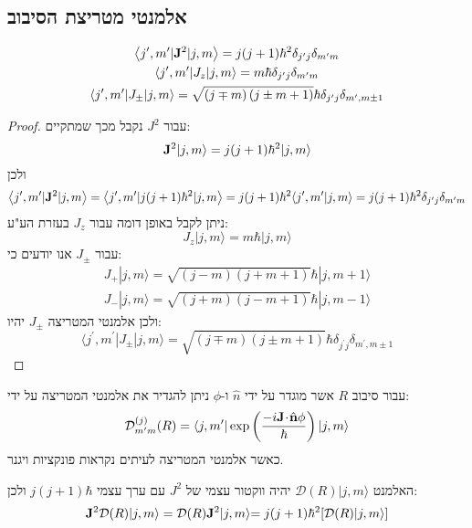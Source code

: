 \documentclass{tstextbook}
\begin{document}
\subsection{אלמנטי מטריצת הסיבוב}

\begin{proposition}
$$\begin{gather}\left\langle  j^{\prime},m^{\prime}|{\bf J}^{2}|j,m \right\rangle=j(j+1)\hbar^{2}\delta_{j^{\prime}j}\delta_{m^{\prime}m}\\\left\langle  j^{\prime},m^{\prime}|J_{z}|j,m \right\rangle=m\hbar\delta_{j^{\prime}j}\delta_{m^{\prime}m}\\ \left\langle  j^{\prime},m^{\prime}|J_{\pm}|j,m \right\rangle=\sqrt{\left( j\mp m \right)\left( j\pm m+1 \right)}\hbar\delta_{j^{\prime}j}\delta_{m^{\prime},m\pm1} 
\end{gather}$$

\end{proposition}
\begin{proof}
עבור \(J^{2}\) נקבל מכך שמתקיים:
$${\bf J}^{2}|j,m\rangle=j(j+1)\hbar^{2}|j,m\rangle$$
ולכן
$$ \left\langle  j^{\prime},m^{\prime}|{\bf J}^{2}|j,m \right\rangle=\left\langle  j^{\prime},m^{\prime}|j(j+1)\hbar^{2}|j,m \right\rangle=j(j+1)\hbar^{2} \langle j^{\prime},m^{\prime}| j,m \rangle=j(j+1)\hbar^{2}\delta_{j^{\prime}j}\delta_{m^{\prime}m}$$
ניתן לקבל באופן דומה עבור \(J_{z}\) בעזרת הע"ע:
$$J_{z}|j,m\rangle=m\hbar|j,m\rangle$$
עבור \(J_{\pm}\) אנו יודעים כי:
$$\begin{gather}J_{+}|j,m\rangle=\sqrt{(j-m)(j+m+1)}\hbar|j,m+1\rangle\\ J_{-}|j,m\rangle=\sqrt{(j+m)(j-m+1)}\hbar|j,m-1\rangle 
\end{gather}$$
ולכן אלמנטי המטריצה \(J_{\pm}\) יהיו:
$$\langle j^{\prime},m^{\prime}|J_{\pm}|j,m\rangle=\sqrt{(j\mp m)(j\pm m+1)}\hbar\delta_{j^{\prime}j}\delta_{m^{\prime},m\pm1}$$

\end{proof}
\begin{definition}
עבור סיבוב \(R\) אשר מוגדר על ידי \(\hat{n}\) ו-\(\phi\) ניתן להגדיר את אלמנטי המטריצה על ידי:
$${\mathcal{D}}_{m^{\prime}m}^{(j)}(R)=\langle j,m^{\prime}|\exp\left(\frac{-i{\bf J}\!\cdot\!{\hat{\bf n}}\phi}{\hbar}\right)|j,m\rangle$$
כאשר אלמנטי המטריצה לעיתים נקראות פונקציות ויגנר. 

\end{definition}
\begin{proposition}
האלמנט \({\mathcal{D}}(R)|j,m\rangle\) יהיה ווקטור עצמי של \(J^{2}\) עם ערך עצמי \(j(j+1)\hbar\) ולכן:
$${{{\bf J}^{2}\mathcal{D}(R)|j,m\rangle=\mathcal{D}(R){\bf J}^{2}|j,m\rangle}} {{=j(j+1)\hbar^{2}[\mathcal{D}(R)|j,m\rangle]}}$$

\end{proposition}
\end{document}
